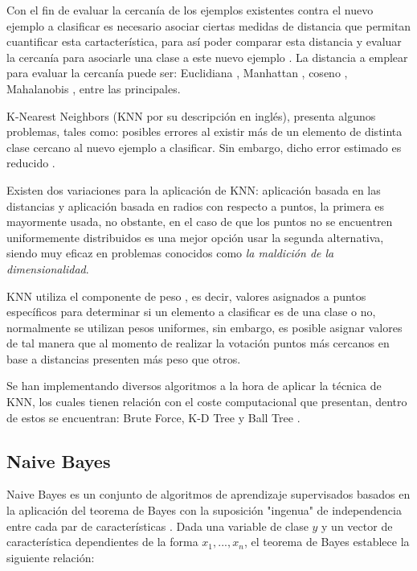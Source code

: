 Con el fin de evaluar la cercanía de los ejemplos existentes contra el nuevo ejemplo a clasificar es necesario asociar ciertas medidas de distancia que permitan cuantificar esta cartacterística, para así poder comparar esta distancia y evaluar la cercanía para asociarle una clase a este nuevo ejemplo \cite{5408784}. La distancia a emplear para evaluar la cercanía puede ser: Euclidiana \cite{DANIELSSON1980227}, Manhattan \cite{PERLIBAKAS2004711}, coseno \cite{LIAO20155328}, Mahalanobis \cite{DEMAESSCHALCK20001}, entre las principales.


K-Nearest Neighbors (KNN por su descripción en inglés), presenta algunos problemas, tales como: posibles errores al existir más de un elemento de distinta clase cercano al nuevo ejemplo a clasificar. Sin embargo, dicho error estimado es reducido \cite{6313426}.
 
Existen dos variaciones para la aplicación de KNN: aplicación basada en las distancias y aplicación basada en radios con respecto a puntos, la primera es mayormente usada, no obstante, en el caso de que los puntos no se encuentren uniformemente distribuidos es una mejor opción usar la segunda alternativa, siendo muy eficaz en problemas conocidos como \textit{la maldición de la dimensionalidad}. 

KNN utiliza el componente de peso \cite{TAN2005667}, es decir, valores asignados a puntos específicos para determinar si un elemento a clasificar es de una clase o no, normalmente se utilizan pesos uniformes, sin embargo, es posible asignar valores de tal manera que al momento de realizar la votación puntos más cercanos en base a distancias presenten más peso que otros.

Se han implementando diversos algoritmos a la hora de aplicar la técnica de KNN, los cuales tienen relación con el coste computacional que presentan, dentro de estos se encuentran: Brute Force, K-D Tree y Ball Tree \cite{pedregosa2011scikit}.

\subsection{Naive Bayes}

Naive Bayes es un conjunto de algoritmos de aprendizaje supervisados basados en la aplicación del teorema de Bayes con la suposición "ingenua" de independencia entre cada par de características \cite{zhang2004optimality}. Dada una variable de clase $y$ y un vector de característica dependientes de la forma $x_1,..., x_n$, el teorema de Bayes establece la siguiente relación:

